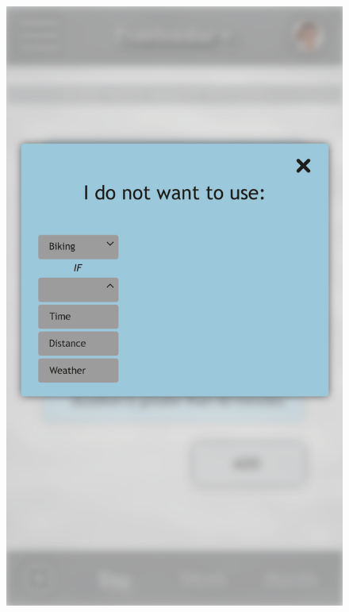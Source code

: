 \begin{figure}[!h]
\begin{minipage}{.275\textwidth}
		\includegraphics[width=\linewidth]{Images/Mockups/MockupConstraintsApp2.png}
	\end{minipage}
	\hspace*{1cm}
	\begin{minipage}{.275\textwidth}
		\centering

\end{minipage}
\end{figure}
